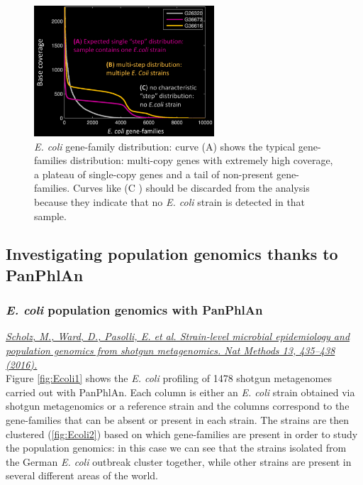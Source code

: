 \begin{figure}[!h]
\centering
\includegraphics[width=0.6\textwidth]{Coverage.png}
\caption{\label{fig:pan3}\emph{E. coli} gene-family distribution: curve (A) shows the typical gene-families distribution: multi-copy genes with extremely high coverage, a plateau of single-copy genes and a tail of non-present gene-families. Curves like (C ) should be discarded from the analysis because they indicate that no \emph{E. coli} strain is detected in that sample.}
\end{figure}

\subsection{Investigating population genomics thanks to PanPhlAn}

\subsubsection{\emph{E. coli} population genomics with PanPhlAn}

\href{https://www.nature.com/articles/nmeth.3802}{\emph{Scholz, M., Ward, D., Pasolli, E. et al. Strain-level microbial epidemiology and population genomics from shotgun metagenomics. Nat Methods 13, 435–438 (2016).}} \\

Figure \ref{fig:Ecoli1} shows the \emph{E. coli} profiling of 1478 shotgun metagenomes carried out with PanPhlAn. Each column is either an \emph{E. coli} strain obtained via shotgun metagenomics or a reference strain and the columns correspond to the gene-families that can be absent or present in each strain. The strains are then clustered (\ref{fig:Ecoli2}) based on which gene-families are present in order to study the population genomics: in this case we can see that the strains isolated from the German \emph{E. coli} outbreak cluster together, while other strains are present in several different areas of the world. 

